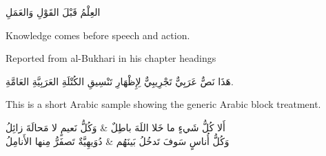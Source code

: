 \begin{athar}
العِلْمُ قَبْلَ القَوْلِ وَالعَمَلِ
\begin{translation}Knowledge comes before speech and action.\end{translation}
\begin{reference}Reported from al-Bukhari in his chapter headings\end{reference}
\end{athar}

\begin{arabicblock}
هَذَا نَصٌّ عَرَبِيٌّ تَجْرِيبِيٌّ لِإِظْهَارِ تَنْسِيقِ الكُتْلَةِ العَرَبِيَّةِ العَامَّةِ.
\begin{translation}This is a short Arabic sample showing the generic Arabic block treatment.\end{translation}
\end{arabicblock}

\begin{poem}
أَلا كُلُّ شَيءٍ ما خَلا اللَهَ باطِلٌ & وَكُلُّ نَعيمٍ لا مَحالَةَ زائِلُ \\
وَكُلُّ أُناسٍ سَوفَ تَدخُلُ بَينَهُم & دُوَيهِيَّةٌ تَصفَرُّ مِنها الأَنامِلُ
\end{poem}
